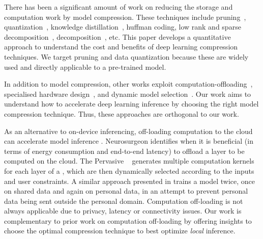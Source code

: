 There has been a significant amount of work on reducing the storage and computation work by model compression. These techniques include
pruning~\cite{Li2016Pruning}, quantization~\cite{Gong2014Compressing,han2015deep}, knowledge
distillation~\cite{Hinton2015Distilling,Sau2016Deep}, huffman coding\FIXME{~\cite{}}, low rank and sparse
decomposition~\cite{denton2014exploiting}, decomposition~\cite{lebedev2014speeding}, etc. This paper develops a quantitative approach to
understand the cost and benefits of deep learning compression techniques. We target pruning and data quantization because these are widely
used and directly applicable to a pre-trained model.



In addition to model compression, other works exploit computation-offloading~\cite{teerapittayanon2017distributed,Kang2017neurosurgeon},
specialised hardware design~\cite{chen2017eyeriss,Han:2016:EEI:3001136.3001163}, and dynamic model
selection~\cite{Taylor:2018:ADL:3211332.3211336}. Our work aims to understand how to accelerate deep learning inference by choosing the
right model compression technique. Thus, these approaches are orthogonal to our work.


As an alternative to on-device inferencing, off-loading computation to the cloud can accelerate \DNN model inference
\cite{teerapittayanon2017distributed}. Neurosurgeon \cite{Kang2017neurosurgeon} identifies when it is beneficial (\eg in terms of energy
consumption and end-to-end latency) to offload a \DNN layer to be computed on the cloud. The Pervasive \CNN~\cite{song2017towards}
generates multiple computation kernels for each layer of a \CNN, which are then dynamically selected according to the inputs and user
constraints. A similar approach presented in \cite{servia2017personal} trains a model twice, once on shared data and again on personal
data, in an attempt to prevent personal data being sent outside the personal domain. Computation off-loading is not always applicable due
to privacy, latency or connectivity issues. Our work is complementary to prior work on computation off-loading by offering insights to
choose the optimal compression technique to best optimize \emph{local} inference.



